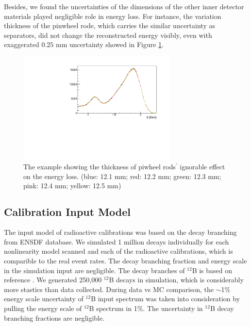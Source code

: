Besides, we found the uncertainties of the dimensions of the other inner detector materials played negligible role in energy loss. 
For instance, the variation thickness of the pinwheel rode, which carries the similar uncertainty as separators, did not change the reconstructed energy visibly, even with exaggerated $0.25$ mm uncertainty showed in Figure \ref{fig:pinwheelthick}.

\begin{figure}[h!]
\centering
\includegraphics[width=80mm]{Figures/pinwheelthick.pdf}
\caption{The example showing the thickness of piwheel rods$^\prime$ ignorable effect on the energy loss. (blue: 12.1 mm; red: 12.2 mm; green: 12.3 mm; pink: 12.4 mm; yellow: 12.5 mm)}
\label{fig:pinwheelthick}
\end{figure}

\subsection{Calibration Input Model}
The input model of radioactive calibrations was based on the decay branching from ENSDF database.
We simulated 1 million decays individually for each nonlinearity model scanned and each of the radioactive calibrations, which is comparible to the real event rates.
The decay branching fraction and energy scale in the simulation input are negligible.
The decay branches of $^{12}$B is based on reference \cite{duke}. 
We generated 250,000 $^{12}$B decays in simulation, which is considerably more stastics than data collected.
During data vs MC comparison, the $\sim$1\% energy scale uncertainty of $^{12}$B input spectrum was taken into consideration by pulling the energy scale of $^{12}$B spectrum in 1\%. 
The uncertainty in $^{12}$B decay branching fractions are negligible.

